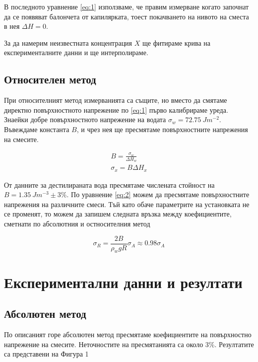 \documentclass[reprint,amsmath,amssymb,aps,floatfix]{revtex4-2}
\begin{document}
В последното уравнение \eqref{eq:1} използваме, че правим измерване когато започнат да се появяват балончета от капилярката, тоест покачването на нивото на сместа в нея $\Delta H = 0$. 

За да намерим неизвестната концентрация $X$ ще фитираме крива на експерименталните данни и ще интерполираме. 

\subsection{Относителен метод}

При относителният метод измерванията са същите, но вместо да смятаме директно повърхностното напрежение по \eqref{eq:1} първо калибрираме уреда. Знаейки добре повърхностното напрежение на водата $\sigma_w = 72.75 \ \si{J m^{-2}}$. Въвеждаме константа $B$, и чрез нея ще пресмятаме повърхностните напрежения на смесите. 

\begin{gather*}
    B = \frac{\sigma_w}{\Delta H_w} \\
    \sigma_x = B \Delta H_x \label{eq:2} \tag{2}
\end{gather*}

От данните за дестилираната вода пресмятаме числената стойност на $B = 1.35 \ \si{Jm^{-3}} \pm 3\% $. 
По уравнение \eqref{eq:2} можем да пресмятаме повърхностните напрежения на различните смеси. Тъй като обаче параметрите на установката не се променят, то можем да запишем следната връзка между коефициентите, сметнати по абсолютния и остносителния метод

\begin{equation*}
    \sigma_R = \frac{2B}{\rho_w g R} \sigma_A \label{eq:3} \approx 0.98 \sigma_A  \tag{3}
\end{equation*}

\section{Експериментални данни и резултати}
\subsection{Абсолютен метод}

По описаният горе абсолютен метод пресмятаме коефициентите на повърхностно напрежение на смесите. Неточностите на пресмятанията са около $3\%$. Резултатите са представени на Фигура 1 
\end{document}
